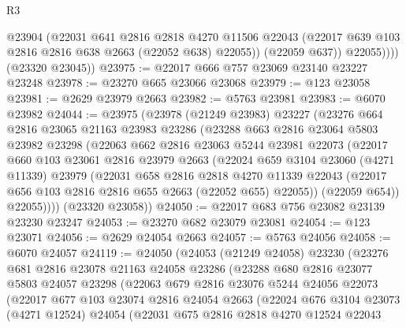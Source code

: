 \begin{lexlean}{R3}
\begin{coremodule}
                @23904
                (@22031
                  @641
                  @2816
                  @2818
                  @4270
                  @11506
                  @22043
                  (@22017 @639 @103 @2816 @2816 @638 @2663 (@22052 @638) @22055))
                (@22059 @637))
              @22055))))
      (@23320 @23045))
@23975 := @22017 @666 @757 @23069 @23140 @23227 @23248
@23978 := @23270 @665 @23066 @23068
@23979 := @123 @23058
@23981 := @2629 @23979 @2663
@23982 := @5763 @23981
@23983 := @6070 @23982
@24044 := @23975
    (@23978
      (@21249 @23983)
      @23227
      (@23276
        @664
        @2816
        @23065
        @21163
        @23983
        @23286
        (@23288
          @663
          @2816
          @23064
          @5803
          @23982
          @23298
          (@22063
            @662
            @2816
            @23063
            @5244
            @23981
            @22073
            (@22017
              @660
              @103
              @23061
              @2816
              @23979
              @2663
              (@22024
                @659
                @3104
                @23060
                (@4271 @11339)
                @23979
                (@22031
                  @658
                  @2816
                  @2818
                  @4270
                  @11339
                  @22043
                  (@22017 @656 @103 @2816 @2816 @655 @2663 (@22052 @655) @22055))
                (@22059 @654))
              @22055))))
      (@23320 @23058))
@24050 := @22017 @683 @756 @23082 @23139 @23230 @23247
@24053 := @23270 @682 @23079 @23081
@24054 := @123 @23071
@24056 := @2629 @24054 @2663
@24057 := @5763 @24056
@24058 := @6070 @24057
@24119 := @24050
    (@24053
      (@21249 @24058)
      @23230
      (@23276
        @681
        @2816
        @23078
        @21163
        @24058
        @23286
        (@23288
          @680
          @2816
          @23077
          @5803
          @24057
          @23298
          (@22063
            @679
            @2816
            @23076
            @5244
            @24056
            @22073
            (@22017
              @677
              @103
              @23074
              @2816
              @24054
              @2663
              (@22024
                @676
                @3104
                @23073
                (@4271 @12524)
                @24054
                (@22031
                  @675
                  @2816
                  @2818
                  @4270
                  @12524
                  @22043

\end{coremodule}
\end{lexlean}
